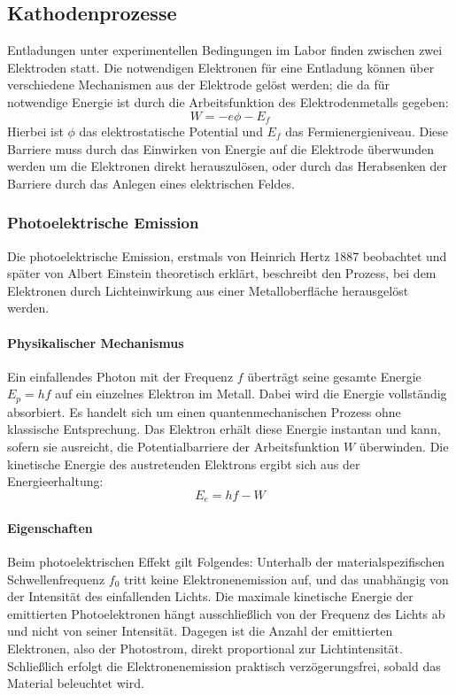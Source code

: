 \subsection{Kathodenprozesse}
Entladungen unter experimentellen Bedingungen im Labor finden zwischen zwei Elektroden statt. Die notwendigen Elektronen für eine Entladung können über verschiedene Mechanismen aus der Elektrode gelöst werden; die da für notwendige Energie ist durch die Arbeitsfunktion des Elektrodenmetalls gegeben:
\begin{equation}
    W = -e \phi - E_f
\end{equation}
Hierbei ist \(\phi\) das elektrostatische Potential und \(E_f\) das Fermienergieniveau. Diese Barriere muss durch das Einwirken von Energie auf die Elektrode überwunden werden um die Elektronen direkt herauszulösen, oder durch das Herabsenken der Barriere durch das Anlegen eines elektrischen Feldes.
\subsubsection{Photoelektrische Emission}
Die photoelektrische Emission, erstmals von Heinrich Hertz 1887 beobachtet und später von Albert Einstein theoretisch erklärt, beschreibt den Prozess, bei dem Elektronen durch Lichteinwirkung aus einer Metalloberfläche herausgelöst werden.
\paragraph{Physikalischer Mechanismus}
Ein einfallendes Photon mit der Frequenz \(f\) überträgt seine gesamte Energie \(E_p = hf\) auf ein einzelnes Elektron im Metall. Dabei wird die Energie vollständig absorbiert. Es handelt sich um einen quantenmechanischen Prozess ohne klassische Entsprechung. Das Elektron erhält diese Energie instantan und kann, sofern sie ausreicht, die Potentialbarriere der Arbeitsfunktion \(W\) überwinden. Die kinetische Energie des austretenden Elektrons ergibt sich aus der Energieerhaltung:
\begin{equation}
    E_e = hf - W
\end{equation}
\paragraph{Eigenschaften}
Beim photoelektrischen Effekt gilt Folgendes: Unterhalb der materialspezifischen Schwellenfrequenz \(f_0\) tritt keine Elektronenemission auf, und das unabhängig von der Intensität des einfallenden Lichts. Die maximale kinetische Energie der emittierten Photoelektronen hängt ausschließlich von der Frequenz des Lichts ab und nicht von seiner Intensität. Dagegen ist die Anzahl der emittierten Elektronen, also der Photostrom, direkt proportional zur Lichtintensität. Schließlich erfolgt die Elektronenemission praktisch verzögerungsfrei, sobald das Material beleuchtet wird. \cite{cooray2014}
